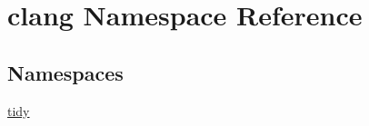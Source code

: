\hypertarget{namespaceclang}{}\section{clang Namespace Reference}
\label{namespaceclang}
\subsection*{Namespaces}
\begin{DoxyCompactItemize}
\item 
 \hyperlink{namespaceclang_1_1tidy}{tidy}
\end{DoxyCompactItemize}
